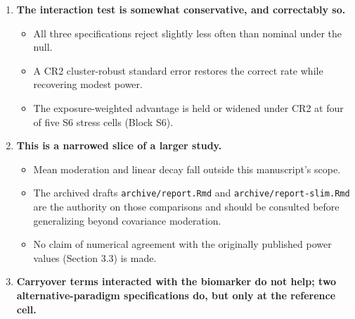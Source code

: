 \documentclass[
  11pt,
]{article}
\providecommand{\tightlist}{%
  \setlength{\itemsep}{0pt}\setlength{\parskip}{0pt}}
\begin{document}
\begin{enumerate}
  \begin{itemize}
  \tightlist
  \item
    Power falls sharply as dropout increases, roughly halving at
    20\%, equally across all three specifications.
  \item
    Preventing dropout is a more effective use of design effort than
    any choice among them.
  \end{itemize}
\item
  \textbf{The interaction test is somewhat conservative, and correctably
  so.}

  \begin{itemize}
  \tightlist
  \item
    All three specifications reject slightly less often than nominal
    under the null.
  \item
    A CR2 cluster-robust standard error restores the correct rate
    while recovering modest power.
  \item
    The exposure-weighted advantage is held or widened under CR2 at
    four of five S6 stress cells (Block S6).
  \end{itemize}
\item
  \textbf{This is a narrowed slice of a larger study.}

  \begin{itemize}
  \tightlist
  \item
    Mean moderation and linear decay fall outside this manuscript's
    scope.
  \item
    The archived drafts \texttt{archive/report.Rmd} and
    \texttt{archive/report-slim.Rmd} are the authority on those comparisons
    and should be consulted before generalizing beyond covariance
    moderation.
  \item
    No claim of numerical agreement with the originally published
    power values (Section 3.3) is made.
  \end{itemize}
\item
  \textbf{Carryover terms interacted with the biomarker do not help; two
  alternative-paradigm specifications do, but only at the reference
  cell.}


\end{enumerate}
\end{document}
